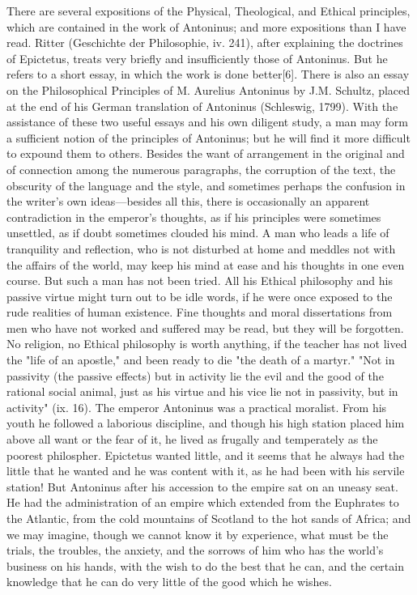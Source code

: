 There are several expositions of the Physical, Theological, and Ethical principles, which are contained in the work of Antoninus; and more expositions than I have read. Ritter (Geschichte der Philosophie, iv. 241), after explaining the doctrines of Epictetus, treats very briefly and insufficiently those of Antoninus. But he refers to a short essay, in which the work is done better[6]. There is also an essay on the Philosophical Principles of M. Aurelius Antoninus by J.M. Schultz, placed at the end of his German translation of Antoninus (Schleswig, 1799). With the assistance of these two useful essays and his own diligent study, a man may form a sufficient notion of the principles of Antoninus; but he will find it more difficult to expound them to others. Besides the want of arrangement in the original and of connection among the numerous paragraphs, the corruption of the text, the obscurity of the language and the style, and sometimes perhaps the confusion in the writer's own ideas—besides all this, there is occasionally an apparent contradiction in the emperor's thoughts, as if his principles were sometimes unsettled, as if doubt sometimes clouded his mind. A man who leads a life of tranquility and reflection, who is not disturbed at home and meddles not with the affairs of the world, may keep his mind at ease and his thoughts in one even course. But such a man has not been tried. All his Ethical philosophy and his passive virtue might turn out to be idle words, if he were once exposed to the rude realities of human existence. Fine thoughts and moral dissertations from men who have not worked and suffered may be read, but they will be forgotten. No religion, no Ethical philosophy is worth anything, if the teacher has not lived the "life of an apostle," and been ready to die "the death of a martyr." "Not in passivity (the passive effects) but in activity lie the evil and the good of the rational social animal, just as his virtue and his vice lie not in passivity, but in activity" (ix. 16). The emperor Antoninus was a practical moralist. From his youth he followed a laborious discipline, and though his high station placed him above all want or the fear of it, he lived as frugally and temperately as the poorest philospher. Epictetus wanted little, and it seems that he always had the little that he wanted and he was content with it, as he had been with his servile station! But Antoninus after his accession to the empire sat on an uneasy seat. He had the administration of an empire which extended from the Euphrates to the Atlantic, from the cold mountains of Scotland to the hot sands of Africa; and we may imagine, though we cannot know it by experience, what must be the trials, the troubles, the anxiety, and the sorrows of him who has the world's business on his hands, with the wish to do the best that he can, and the certain knowledge that he can do very little of the good which he wishes.

